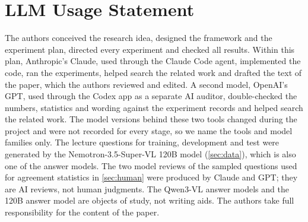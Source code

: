\section*{LLM Usage Statement}
The authors conceived the research idea, designed the framework and the experiment plan, directed every experiment and checked all results.
Within this plan, Anthropic's Claude, used through the Claude Code agent, implemented the code, ran the experiments, helped search the related work and drafted the text of the paper, which the authors reviewed and edited.
A second model, OpenAI's GPT, used through the Codex app as a separate AI auditor, double-checked the numbers, statistics and wording against the experiment records and helped search the related work.
The model versions behind these two tools changed during the project and were not recorded for every stage, so we name the tools and model families only.
The lecture questions for training, development and test were generated by the Nemotron-3.5-Super-VL 120B model (\cref{sec:data}), which is also one of the answer models.
The two model reviews of the sampled questions used for agreement statistics in \cref{sec:human} were produced by Claude and GPT; they are AI reviews, not human judgments.
The Qwen3-VL answer models and the 120B answer model are objects of study, not writing aids.
The authors take full responsibility for the content of the paper.
